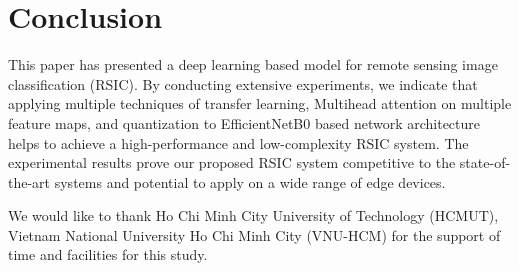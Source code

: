 \documentclass[sigconf]{acmart}
\begin{document}
\section{Conclusion}
%
This paper has presented a deep learning based model for remote sensing image classification (RSIC).
By conducting extensive experiments, we indicate that applying multiple techniques of transfer learning, Multihead attention on  multiple feature maps, and quantization to EfficientNetB0 based network architecture helps to achieve a high-performance and low-complexity RSIC system. 
The experimental results prove our proposed RSIC system competitive to the state-of-the-art systems and potential to apply on a wide range of edge devices.

\begin{acks}
    We would like to thank Ho Chi Minh City University of Technology (HCMUT), Vietnam National University Ho Chi Minh City (VNU-HCM) for the support of time and facilities for this study.
\end{acks}



\end{document}
